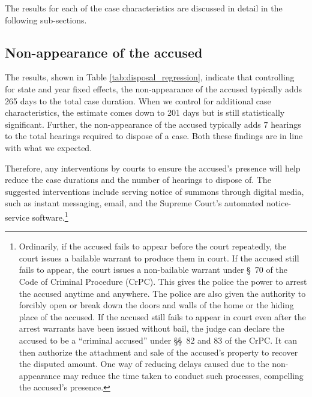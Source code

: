 \documentclass[12pt,a4paper]{article}
\begin{document}
	The results for each of the case characteristics are discussed in detail in the following sub-sections.
	
	\subsection{Non-appearance of the accused}
	\label{sec:non-appe-accus-1}
	
	The results, shown in Table \ref{tab:disposal_regression}, indicate that controlling for state and year fixed effects, the non-appearance of the accused typically adds 265 days to the total case duration. When we control for additional case characteristics, the estimate comes down to 201 days but is still statistically significant. Further, the non-appearance of the accused typically adds 7 hearings to the total hearings required to dispose of a case. Both these findings are in line with what we expected.
	
	
	Therefore, any interventions by courts to ensure the accused's presence will help reduce the case durations and the number of hearings to dispose of. The suggested interventions include serving notice of summons through digital media, such as instant messaging, email, and the Supreme Court's automated notice-service software.\footnote{Ordinarily, if the accused fails to appear before the court repeatedly, the court issues a bailable warrant to produce them in court. If the accused still fails to appear, the court issues a non-bailable warrant under \S~70 of the Code of Criminal Procedure (CrPC). This gives the police the power to arrest the accused anytime and anywhere. The police are also given the authority to forcibly open or break down the doors and walls of the home or the hiding place of the accused. If the accused still fails to appear in court even after the arrest warrants have been issued without bail, the judge can declare the accused to be a ``criminal accused'' under \S\S~82 and 83 of the CrPC. It can then authorize the attachment and sale of the accused's property to recover the disputed amount. One way of reducing delays caused due to the non-appearance may reduce the time taken to conduct such processes, compelling the accused's presence.}
	
\end{document}
